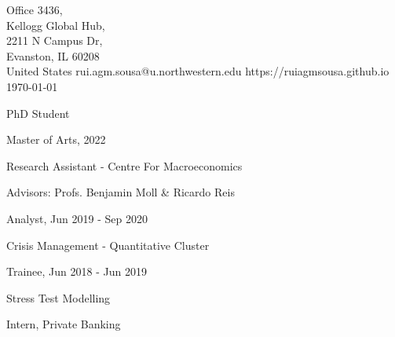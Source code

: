 \documentclass{practical-resume}
\begin{document}
\namehead

\begin{address}{
	Office 3436, \\
	Kellogg Global Hub, \\
	2211 N Campus Dr, \\
	Evanston, IL 60208 \\
	United States
}
{rui.agm.sousa@u.northwestern.edu}
{https://ruiagmsousa.github.io}
{\today}
\end{address}

\begin{position}{PhD Student}{}
	\item Master of Arts, 2022
\end{position}


	\begin{position}{Research Assistant - }{Centre For Macroeconomics}
		\item Advisors: Profs. Benjamin Moll \& Ricardo Reis
	\end{position}


	\begin{position}{Analyst, }{Jun 2019 - Sep 2020}
		\item Crisis Management - Quantitative Cluster
	\end{position}
	\begin{position}{Trainee, }{Jun 2018 - Jun 2019}
		\item Stress Test Modelling
	\end{position}
		
	\begin{position}[noitemize]{Intern, }{Private Banking}
	\end{position}
	
	
\end{document}
